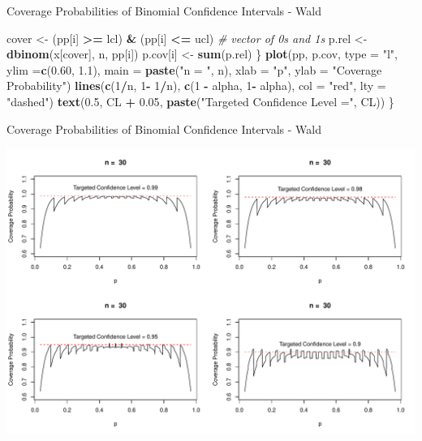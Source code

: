 \documentclass[
  ignorenonframetext,
]{beamer}
\newenvironment{Shaded}{\begin{snugshade}}{\end{snugshade}}
\newcommand{\AttributeTok}[1]{\textcolor[rgb]{0.13,0.29,0.53}{#1}}
\newcommand{\CommentTok}[1]{\textcolor[rgb]{0.56,0.35,0.01}{\textit{#1}}}
\newcommand{\DecValTok}[1]{\textcolor[rgb]{0.00,0.00,0.81}{#1}}
\newcommand{\FloatTok}[1]{\textcolor[rgb]{0.00,0.00,0.81}{#1}}
\newcommand{\FunctionTok}[1]{\textcolor[rgb]{0.13,0.29,0.53}{\textbf{#1}}}
\newcommand{\NormalTok}[1]{#1}
\newcommand{\OtherTok}[1]{\textcolor[rgb]{0.56,0.35,0.01}{#1}}
\newcommand{\SpecialCharTok}[1]{\textcolor[rgb]{0.81,0.36,0.00}{\textbf{#1}}}
\newcommand{\StringTok}[1]{\textcolor[rgb]{0.31,0.60,0.02}{#1}}
\begin{document}
\begin{frame}[fragile]{Coverage Probabilities of Binomial Confidence
Intervals - Wald}
\begin{Shaded}
\begin{Highlighting}[]
\NormalTok{  cover }\OtherTok{\textless{}{-}}\NormalTok{ (pp[i] }\SpecialCharTok{\textgreater{}=}\NormalTok{ lcl) }\SpecialCharTok{\&}\NormalTok{ (pp[i] }\SpecialCharTok{\textless{}=}\NormalTok{ ucl)  }\CommentTok{\# vector of 0s and 1s}
\NormalTok{  p.rel }\OtherTok{\textless{}{-}} \FunctionTok{dbinom}\NormalTok{(x[cover], n, pp[i])}
\NormalTok{  p.cov[i] }\OtherTok{\textless{}{-}} \FunctionTok{sum}\NormalTok{(p.rel)}
\NormalTok{\}}
\FunctionTok{plot}\NormalTok{(pp, p.cov, }\AttributeTok{type =} \StringTok{"l"}\NormalTok{, }\AttributeTok{ylim =}\FunctionTok{c}\NormalTok{(}\FloatTok{0.60}\NormalTok{, }\FloatTok{1.1}\NormalTok{), }\AttributeTok{main =} \FunctionTok{paste}\NormalTok{(}\StringTok{"n = "}\NormalTok{, n), }
     \AttributeTok{xlab =} \StringTok{"p"}\NormalTok{, }\AttributeTok{ylab =} \StringTok{"Coverage Probability"}\NormalTok{)}
\FunctionTok{lines}\NormalTok{(}\FunctionTok{c}\NormalTok{(}\DecValTok{1}\SpecialCharTok{/}\NormalTok{n, }\DecValTok{1}\SpecialCharTok{{-}} \DecValTok{1}\SpecialCharTok{/}\NormalTok{n), }\FunctionTok{c}\NormalTok{(}\DecValTok{1} \SpecialCharTok{{-}}\NormalTok{ alpha, }\DecValTok{1}\SpecialCharTok{{-}}\NormalTok{ alpha), }\AttributeTok{col =} \StringTok{"red"}\NormalTok{, }\AttributeTok{lty =} \StringTok{"dashed"}\NormalTok{)}
      \FunctionTok{text}\NormalTok{(}\FloatTok{0.5}\NormalTok{, CL }\SpecialCharTok{+} \FloatTok{0.05}\NormalTok{, }\FunctionTok{paste}\NormalTok{(}\StringTok{"Targeted Confidence Level ="}\NormalTok{, CL))}
\NormalTok{\}}
\end{Highlighting}
\end{Shaded}

\normalsize
\end{frame}

\begin{frame}{Coverage Probabilities of Binomial Confidence Intervals -
Wald}
\protect\hypertarget{coverage-probabilities-of-binomial-confidence-intervals---wald-1}{}
\tiny

\begin{center}\includegraphics[width=0.9\linewidth,height=0.8\textheight]{Week11_12_13_files/figure-beamer/unnamed-chunk-17-1} \end{center}
\normalsize
\end{frame}
\end{document}

